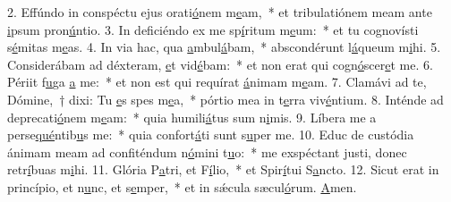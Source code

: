 2. Effúndo in conspéctu ejus orati\uline{ó}nem m\uline{e}am,~* et tribulatiónem meam ante \uline{i}psum pron\uline{ú}ntio.
3. In deficiéndo ex me sp\uline{í}ritum m\uline{e}um:~* et tu cognovísti s\uline{é}mitas m\uline{e}as.
4. In via hac, qua \uline{a}mbul\uline{á}bam,~* abscondérunt l\uline{á}queum m\uline{i}hi.
5. Considerábam ad déxteram, \uline{e}t vid\uline{é}bam:~* et non erat qui cogn\uline{ó}scer\uline{e}t me.
6. Périit f\uline{u}ga \uline{a} me:~* et non est qui requírat \uline{á}nimam m\uline{e}am.
7. Clamávi ad te, Dómine,~† dixi: Tu \uline{e}s spes m\uline{e}a,~* pórtio mea in t\uline{e}rra viv\uline{é}ntium.
8. Inténde ad deprecati\uline{ó}nem m\uline{e}am:~* quia humili\uline{á}tus sum n\uline{i}mis.
9. Líbera me a perse\uline{qué}ntib\uline{u}s me:~* quia confort\uline{á}ti sunt s\uline{u}per me.
10. Educ de custódia ánimam meam ad confiténdum n\uline{ó}mini t\uline{u}o:~* me exspéctant justi, donec retr\uline{í}buas m\uline{i}hi.
11. Glória P\uline{a}tri, et F\uline{í}lio,~* et Spir\uline{í}tui S\uline{a}ncto.
12. Sicut erat in princípio, et n\uline{u}nc, et s\uline{e}mper,~* et in sǽcula sæcul\uline{ó}rum. \uline{A}men.
